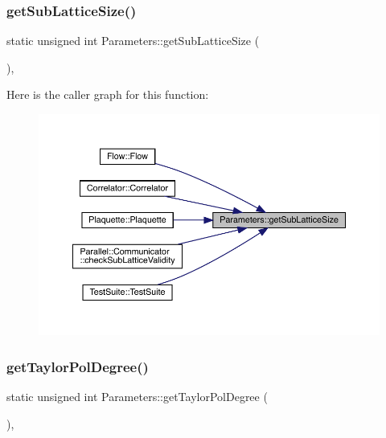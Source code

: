 \subsubsection{\texorpdfstring{getSubLatticeSize()}{getSubLatticeSize()}}
{\footnotesize\ttfamily static unsigned int Parameters\+::get\+Sub\+Lattice\+Size (\begin{DoxyParamCaption}{ }\end{DoxyParamCaption})\hspace{0.3cm}{\ttfamily [inline]}, {\ttfamily [static]}}

Here is the caller graph for this function\+:\nopagebreak
\begin{figure}[H]
\begin{center}
\leavevmode
\includegraphics[width=350pt]{class_parameters_aff629ab94d99807364926008fb4e1e67_icgraph}
\end{center}
\end{figure}
\mbox{\label{class_parameters_a272f8ebfbd305fb4a3b03db68417fc90}} 
\subsubsection{\texorpdfstring{getTaylorPolDegree()}{getTaylorPolDegree()}}
{\footnotesize\ttfamily static unsigned int Parameters\+::get\+Taylor\+Pol\+Degree (\begin{DoxyParamCaption}{ }\end{DoxyParamCaption})\hspace{0.3cm}{\ttfamily [inline]}, {\ttfamily [static]}}

